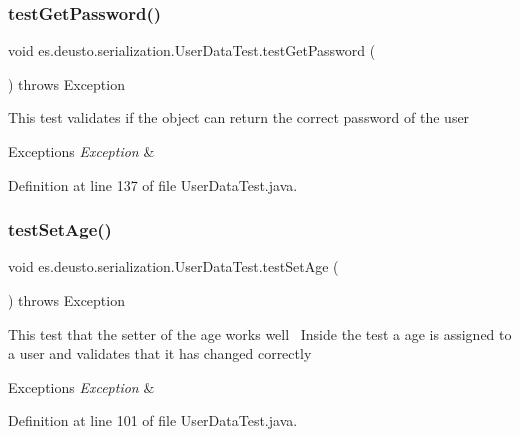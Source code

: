 \subsubsection{\texorpdfstring{test\+Get\+Password()}{testGetPassword()}}
{\footnotesize\ttfamily void es.\+deusto.\+serialization.\+User\+Data\+Test.\+test\+Get\+Password (\begin{DoxyParamCaption}{ }\end{DoxyParamCaption}) throws Exception}

This test validates if the object can return the correct password of the user 
\begin{DoxyExceptions}{Exceptions}
{\em Exception} & \\
\hline
\end{DoxyExceptions}


Definition at line 137 of file User\+Data\+Test.\+java.

\mbox{\label{classes_1_1deusto_1_1serialization_1_1_user_data_test_aa3241903064474a486744a64fbcd9c13}} 
\subsubsection{\texorpdfstring{test\+Set\+Age()}{testSetAge()}}
{\footnotesize\ttfamily void es.\+deusto.\+serialization.\+User\+Data\+Test.\+test\+Set\+Age (\begin{DoxyParamCaption}{ }\end{DoxyParamCaption}) throws Exception}

This test that the setter of the age works well~\newline
Inside the test a age is assigned to a user and validates that it has changed correctly~\newline

\begin{DoxyExceptions}{Exceptions}
{\em Exception} & \\
\hline
\end{DoxyExceptions}


Definition at line 101 of file User\+Data\+Test.\+java.

\mbox{\label{classes_1_1deusto_1_1serialization_1_1_user_data_test_a4f08dcab38f34ee37a4417e6c3e3e8e8}} 
